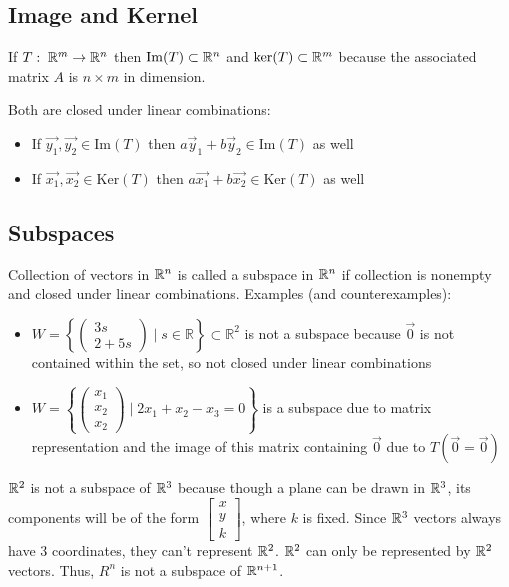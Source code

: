 \subsection{Image and Kernel}

If $T:\;\mathbb{R}^m\rightarrow \mathbb{R}^n$ then $\mathrm{Im}(T)\subset \mathbb{R}^n$ and
$\mathrm{ker}(T)\subset \mathbb{R}^m$ because the associated matrix $A$ is $n\times m$ in dimension.\newline

\noindent
Both are closed under linear combinations:
\begin{itemize}
    \item If $\vec{y_1},\vec{y_2}\in \mathrm{Im}(T)$ then $a \vec{y}_{1}+b \vec{y}_{2} \in \mathrm{Im}(T)$ as well
    \item If $\vec{x_1},\vec{x_2}\in \mathrm{Ker}(T)$ then $a\vec{x_1}+b\vec{x_2}\in \mathrm{Ker}(T)$ as well
\end{itemize}

\subsection{Subspaces}

Collection of vectors in $\mathbb{R}^n$ is called a subspace in $\mathbb{R}^n$ if collection is nonempty and closed under linear combinations.
Examples (and counterexamples):

\begin{itemize}
    \item $W=\left\{\left(\begin{array}{c}
        3 s \\
        2+5 s
        \end{array}\right) \mid s \in \mathbb{R}\right\} \subset \mathbb{R}^{2}$
        is not a subspace because $\vec{0}$ is not contained within the set, so not closed under linear combinations
    \item $W=\left\{\left(\begin{array}{l}
        x_{1} \\
        x_{2} \\
        x_{2}
        \end{array}\right) \mid 2 x_{1}+x_{2}-x_{3}=0\right\}$ is a subspace due to matrix representation and 
        the image of this matrix containing $\vec{0}$ due to $T(\vec{0}=\vec{0})$
\end{itemize}

\noindent
$\mathbb{R}^2$ is not a subspace of $\mathbb{R}^3$ because though a plane can be drawn in $\mathbb{R}^3$, its components will be of the form
$\begin{bmatrix}x\\ y\\k\end{bmatrix}$, where $k$ is fixed. Since $\mathbb{R}^3$ vectors always have 3 coordinates, they can't represent $\mathbb{R}^2$.
$\mathbb{R}^2$ can only be represented by $\mathbb{R}^2$ vectors. Thus, $R^n$ is not a subspace of $\mathbb{R}^{n+1}$.\\


